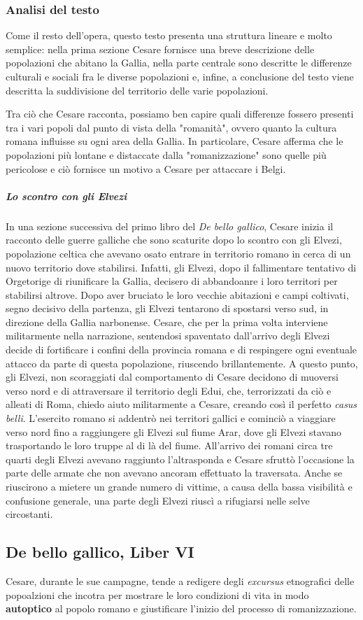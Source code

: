 \documentclass[10pt,a4paper]{article}
\begin{document}
	\subsubsection{Analisi del testo}

	Come il resto dell'opera, questo testo presenta una struttura lineare e molto semplice: nella prima sezione Cesare fornisce una breve descrizione delle popolazioni che abitano la Gallia, nella parte centrale sono descritte le differenze culturali e sociali fra le diverse popolazioni e, infine, a conclusione del testo viene descritta la suddivisione del territorio delle varie popolazioni.

	Tra ciò che Cesare racconta, possiamo ben capire quali differenze fossero presenti tra i vari popoli dal punto di vista della "romanità", ovvero quanto la cultura romana influisse su ogni area della Gallia. In particolare, Cesare afferma che le popolazioni più lontane e distaccate dalla "romanizzazione" sono quelle più pericolose e ciò fornisce un motivo a Cesare per attaccare i Belgi.

	\subparagraph{Lo scontro con gli Elvezi}

	In una sezione successiva del primo libro del \textit{De bello gallico}, Cesare inizia il racconto delle guerre galliche che sono scaturite dopo lo scontro con gli Elvezi, popolazione celtica che avevano osato entrare in territorio romano in cerca di un nuovo territorio dove stabilirsi. Infatti, gli Elvezi, dopo il fallimentare tentativo di Orgetorige di riunificare la Gallia, decisero di abbandoanre i loro territori per stabilirsi altrove. Dopo aver bruciato le loro vecchie abitazioni e campi coltivati, segno decisivo della partenza, gli Elvezi tentarono di spostarsi verso sud, in direzione della Gallia narbonense. Cesare, che per la prima volta interviene militarmente nella narrazione, sentendosi spaventato dall'arrivo degli Elvezi decide di fortificare i confini della provincia romana e di respingere ogni eventuale attacco da parte di questa popolazione, riuscendo brillantemente. A questo punto, gli Elvezi, non scoraggiati dal comportamento di Cesare decidono di muoversi verso nord e di attraversare il territorio degli Edui, che, terrorizzati da ciò e alleati di Roma, chiedo aiuto militarmente a Cesare, creando così il perfetto \textit{casus belli}. L'esercito romano si addentrò nei territori gallici e cominciò a viaggiare verso nord fino a raggiungere gli Elvezi sul fiume Arar, dove gli Elvezi stavano trasportando le loro truppe al di là del fiume. All'arrivo dei romani circa tre quarti degli Elvezi avevano raggiunto l'altrasponda e Cesare sfruttò l'occasione la parte delle armate che non avevano ancoram effettuato la traversata. Anche se riuscirono a mietere un grande numero di vittime, a causa della bassa visibilità e confusione generale, una parte degli Elvezi riuscì a rifugiarsi nelle selve circostanti.

	\subsection{De bello gallico, Liber VI}

	Cesare, durante le sue campagne, tende a redigere degli \textit{excursus} etnografici delle popoalzioni che incotra per mostrare le loro condizioni di vita in modo \textbf{autoptico} al popolo romano e giustificare l'inizio del processo di romanizzazione.
\end{document}
